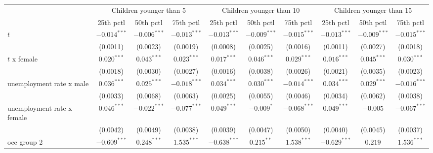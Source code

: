 \begin{tabular}{l|ccc|ccc|ccc}
\toprule
{} & \multicolumn{3}{c}{Children younger than 5} & \multicolumn{3}{c}{Children younger than 10} & \multicolumn{3}{c}{Children younger than 15} \\
{} &               25th pctl &       50th pctl &       75th pctl &                25th pctl &       50th pctl &       75th pctl &                25th pctl &       50th pctl &       75th pctl \\
\midrule
$t$                        &          $-0.014^{***}$ &  $-0.006^{***}$ &  $-0.013^{***}$ &           $-0.013^{***}$ &  $-0.009^{***}$ &  $-0.015^{***}$ &           $-0.013^{***}$ &  $-0.009^{***}$ &  $-0.015^{***}$ \\
                           &                (0.0011) &        (0.0023) &        (0.0019) &                 (0.0008) &        (0.0025) &        (0.0016) &                 (0.0011) &        (0.0027) &        (0.0018) \\
$t$ x female               &           $0.020^{***}$ &   $0.043^{***}$ &   $0.023^{***}$ &            $0.017^{***}$ &   $0.046^{***}$ &   $0.029^{***}$ &            $0.016^{***}$ &   $0.045^{***}$ &   $0.030^{***}$ \\
                           &                (0.0018) &        (0.0030) &        (0.0027) &                 (0.0016) &        (0.0038) &        (0.0026) &                 (0.0021) &        (0.0035) &        (0.0023) \\
unemployment rate x male   &           $0.036^{***}$ &   $0.025^{***}$ &  $-0.018^{***}$ &            $0.034^{***}$ &   $0.030^{***}$ &  $-0.014^{***}$ &            $0.034^{***}$ &   $0.029^{***}$ &  $-0.016^{***}$ \\
                           &                (0.0033) &        (0.0068) &        (0.0063) &                 (0.0025) &        (0.0055) &        (0.0046) &                 (0.0034) &        (0.0062) &        (0.0038) \\
unemployment rate x female &           $0.046^{***}$ &  $-0.022^{***}$ &  $-0.077^{***}$ &            $0.049^{***}$ &      $-0.009^*$ &  $-0.068^{***}$ &            $0.049^{***}$ &        $-0.005$ &  $-0.067^{***}$ \\
                           &                (0.0042) &        (0.0049) &        (0.0038) &                 (0.0039) &        (0.0047) &        (0.0050) &                 (0.0040) &        (0.0045) &        (0.0037) \\
occ group 2                &          $-0.609^{***}$ &   $0.248^{***}$ &   $1.535^{***}$ &           $-0.638^{***}$ &    $0.215^{**}$ &   $1.538^{***}$ &           $-0.629^{***}$ &         $0.219$ &   $1.536^{***}$ \\

\end{tabular}
